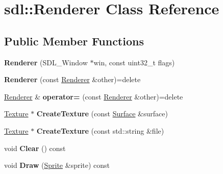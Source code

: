 \hypertarget{classsdl_1_1Renderer}{\section{sdl\-:\-:Renderer Class Reference}
\label{classsdl_1_1Renderer}
}
\subsection*{Public Member Functions}
\begin{DoxyCompactItemize}
\item 
\hypertarget{classsdl_1_1Renderer_ab59359fea7ca532fb77150ddd94b43bb}{{\bfseries Renderer} (S\-D\-L\-\_\-\-Window $\ast$win, const uint32\-\_\-t flags)}\label{classsdl_1_1Renderer_ab59359fea7ca532fb77150ddd94b43bb}

\item 
\hypertarget{classsdl_1_1Renderer_a3ca6bc204c8a7572f94c2f7f217b83c3}{{\bfseries Renderer} (const \hyperlink{classsdl_1_1Renderer}{Renderer} \&other)=delete}\label{classsdl_1_1Renderer_a3ca6bc204c8a7572f94c2f7f217b83c3}

\item 
\hypertarget{classsdl_1_1Renderer_a61c72fdb028a6661dc1af381f00e661e}{\hyperlink{classsdl_1_1Renderer}{Renderer} \& {\bfseries operator=} (const \hyperlink{classsdl_1_1Renderer}{Renderer} \&other)=delete}\label{classsdl_1_1Renderer_a61c72fdb028a6661dc1af381f00e661e}

\item 
\hypertarget{classsdl_1_1Renderer_ae26bde56ec21c25d2902564a222f4cc7}{\hyperlink{classsdl_1_1Texture}{Texture} $\ast$ {\bfseries Create\-Texture} (const \hyperlink{classsdl_1_1Surface}{Surface} \&surface)}\label{classsdl_1_1Renderer_ae26bde56ec21c25d2902564a222f4cc7}

\item 
\hypertarget{classsdl_1_1Renderer_ae8f7d916f811326862659480588dd849}{\hyperlink{classsdl_1_1Texture}{Texture} $\ast$ {\bfseries Create\-Texture} (const std\-::string \&file)}\label{classsdl_1_1Renderer_ae8f7d916f811326862659480588dd849}

\item 
\hypertarget{classsdl_1_1Renderer_a09e76267aa287255d5c09982d5483e6a}{void {\bfseries Clear} () const }\label{classsdl_1_1Renderer_a09e76267aa287255d5c09982d5483e6a}

\item 
\hypertarget{classsdl_1_1Renderer_a16bb42c4d6908311c393511e5f6d5cdf}{void {\bfseries Draw} (\hyperlink{classsdl_1_1Sprite}{Sprite} \&sprite) const }\label{classsdl_1_1Renderer_a16bb42c4d6908311c393511e5f6d5cdf}


\end{DoxyCompactItemize}
